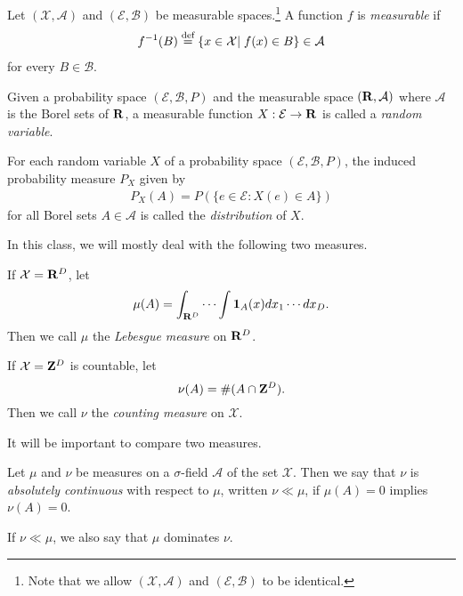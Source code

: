 \documentclass[twoside]{article}
\newcommand{\defeq}{\buildrel \text{d{}ef}\over =}
\begin{document}
\begin{definition}\label{def:measurable_function}\citep[Def. 1.7, p.~4]{keener}
Let $(\mathcal X, \mathcal A)$ and $(\mathcal E, \mathcal B)$ be measurable
spaces.\footnote{Note that we allow $(\mathcal X, \mathcal A)$ and
$(\mathcal E, \mathcal B)$ to be identical.}  A function $f$ is
\emph{measurable} if
\begin{align*}
f^{-1}(B) \defeq \{ x\in \mathcal X |\; f(x) \in B \} \in \mathcal A
\end{align*}
for every $B \in  \mathcal B$.
\end{definition}

\begin{definition}\label{def:random_variable}
Given a probability space $(\mathcal E, \mathcal B, P)$ and the measurable
space $(\mathbf{R}, \mathcal A)$ where $\mathcal A$ is the Borel
sets of $\mathbf{R}$, a measurable function $X : \mathcal E  \rightarrow \mathbf{R}$
is called a \emph{random variable}.
\end{definition}

For each random variable $X$ of a probability space $(\mathcal E, \mathcal B, P)$,
the induced probability measure $P_X$ given by
\begin{align*}
P_X(A) = P(\{e \in \mathcal E: X(e) \in A\}) 
\end{align*}
for all Borel sets $A \in  \mathcal A$ is called the \emph{distribution} of $X$.


In this class, we will mostly deal with the following two measures.
\begin{example} 
 If $\mathcal X = \mathbf{R}^D$, let
    \[ \mu(A) = \int_{\mathbf{R}^D} \cdots \int \mathbf{1}_A(x) dx_1 \cdots dx_D. \]
  Then we call $\mu$ the \emph{Lebesgue measure} on $\mathbf{R}^D$.
\end{example}
\begin{example} 
  If $\mathcal X = \mathbf{Z}^D$ is countable, let
    \[ \nu(A) = \#(A \cap \mathbf{Z}^D). \]
  Then we call $\nu$ the \emph{counting measure} on $\mathcal X$.
\end{example}

It will be important to compare two measures.

\begin{definition}\label{def:absolutecontinuity}\citep[Def. 1.9, p.~7]{keener}
  Let $\mu$ and $\nu$ be measures on a $\sigma$-field $\mathcal A$ of the
  set $\mathcal X$. Then we say that $\nu$ is \emph{absolutely continuous} with
  respect to $\mu$, written $\nu \ll \mu$, if
  $\mu(A) = 0$ implies $\nu(A) = 0$.
\end{definition}
If $\nu \ll \mu$, we also say that $\mu$ dominates $\nu$.
\end{document}
